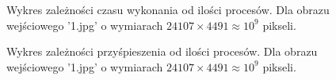 \documentclass[a4paper,12pt]{article}
\begin{document}
\begin{figure}
	\begin{center}
 		
	\end{center}
	
    \caption{Wykres zależności czasu wykonania od ilości procesów.
     Dla obrazu wejściowego '1.jpg' o wymiarach \(24107 \times 4491 \approx 10^9\) pikseli.}

\end{figure}



\begin{figure}
	\begin{center}
 		   		 		
	\end{center}
	
    \caption{Wykres zależności przyśpieszenia od ilości procesów.
     Dla obrazu wejściowego '1.jpg' o wymiarach \(24107 \times 4491 \approx 10^9\) pikseli.}
\end{figure}
\end{document}
